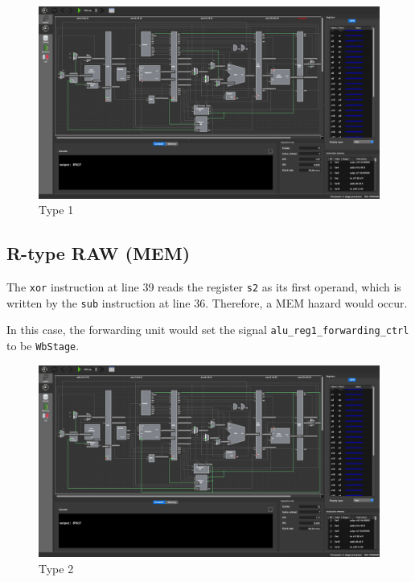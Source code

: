 \documentclass[12pt, a4paper]{article}
\begin{document}
\begin{figure}[htbp]
\centering
\includegraphics[width=\linewidth]{1}
\caption{Type 1}
\label{fig:1}
\end{figure}

\pagebreak[4]

\subsection{R-type RAW (MEM)}

The \texttt{xor} instruction at line 39 reads the register \texttt{s2} as its first operand, which is written by the \texttt{sub} instruction at line 36. Therefore, a MEM hazard would occur.

In this case, the forwarding unit would set the signal \texttt{alu\_reg1\_forwarding\_ctrl} to be \texttt{WbStage}.

\begin{figure}[htbp]
\centering
\includegraphics[width=\linewidth]{2}
\caption{Type 2}
\label{fig:2}
\end{figure}

\pagebreak[4]
\end{document}
